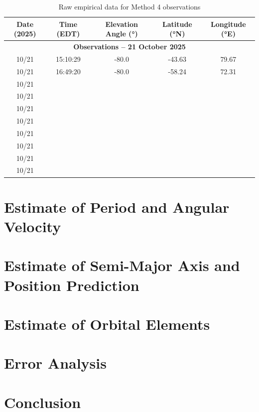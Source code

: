 \documentclass{article}
\begin{document}
\begin{table}[H]
    \centering
    \caption{Raw empirical data for Method 4 observations}
    \label{tab:method4_data}
    \renewcommand{\arraystretch}{1.2}
    \begin{tabular}{|c|c|c|c|c|}
        \hline
        \textbf{Date (2025)} & \textbf{Time (EDT)} & \textbf{Elevation Angle (°)} & \textbf{Latitude (°N)} & \textbf{Longitude (°E)} \\ \hline
        \multicolumn{5}{|c|}{\textbf{Observations – 21 October 2025}} \\ \hline
        10/21 & 15:10:29 & -80.0 & -43.63 & 79.67\\ \hline
        10/21 & 16:49:20 & -80.0 & -58.24 & 72.31\\ \hline
        10/21 & & & & \\ \hline
        10/21 & & & & \\ \hline
        10/21 & & & & \\ \hline
        10/21 & & & & \\ \hline
        10/21 & & & & \\ \hline
        10/21 & & & & \\ \hline
        10/21 & & & & \\ \hline
        10/21 & & & & \\ \hline
    \end{tabular}
\end{table}





\section{Estimate of Period and Angular Velocity}

\section{Estimate of Semi-Major Axis and Position Prediction}

\section{Estimate of Orbital Elements}

\section{Error Analysis}

\section{Conclusion}
\end{document}
